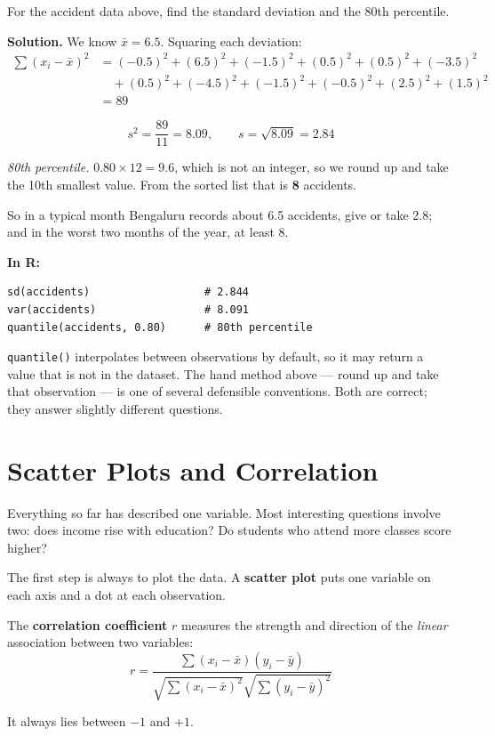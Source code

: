 \documentclass[a4paper,11pt]{article}
\newcommand{\Rc}{\textbf{\color{NavyBlue}In R:}\ }
\begin{document}
\begin{example}
For the accident data above, find the standard deviation and the 80th
percentile.

\medskip
\textbf{Solution.} We know $\bar{x} = 6.5$. Squaring each deviation:
\begin{align*}
\sum (x_i - \bar{x})^2 &= (-0.5)^2 + (6.5)^2 + (-1.5)^2 + (0.5)^2 + (0.5)^2 + (-3.5)^2 \\
&\quad + (0.5)^2 + (-4.5)^2 + (-1.5)^2 + (-0.5)^2 + (2.5)^2 + (1.5)^2 \\
&= 89
\end{align*}

\[ s^2 = \frac{89}{11} = 8.09, \qquad s = \sqrt{8.09} = 2.84 \]

\emph{80th percentile.} $0.80 \times 12 = 9.6$, which is not an integer, so we
round up and take the 10th smallest value. From the sorted list that is
\textbf{8} accidents.

So in a typical month Bengaluru records about 6.5 accidents, give or take 2.8;
and in the worst two months of the year, at least 8.
\end{example}

\Rc
\begin{lstlisting}
sd(accidents)                  # 2.844
var(accidents)                 # 8.091
quantile(accidents, 0.80)      # 80th percentile
\end{lstlisting}

\begin{watchbox}
\texttt{quantile()} interpolates between observations by default, so it may
return a value that is not in the dataset. The hand method above --- round up
and take that observation --- is one of several defensible conventions. Both are
correct; they answer slightly different questions.
\end{watchbox}

\section{Scatter Plots and Correlation}

Everything so far has described one variable. Most interesting questions involve
two: does income rise with education? Do students who attend more classes score
higher?

The first step is always to plot the data. A \textbf{scatter plot} puts one
variable on each axis and a dot at each observation.

\begin{keybox}
The \textbf{correlation coefficient} $r$ measures the strength and direction of
the \emph{linear} association between two variables:
\[ r = \frac{\sum (x_i - \bar{x})(y_i - \bar{y})}
            {\sqrt{\sum (x_i - \bar{x})^2}\sqrt{\sum (y_i - \bar{y})^2}} \]

It always lies between $-1$ and $+1$.
\end{keybox}
\end{document}
